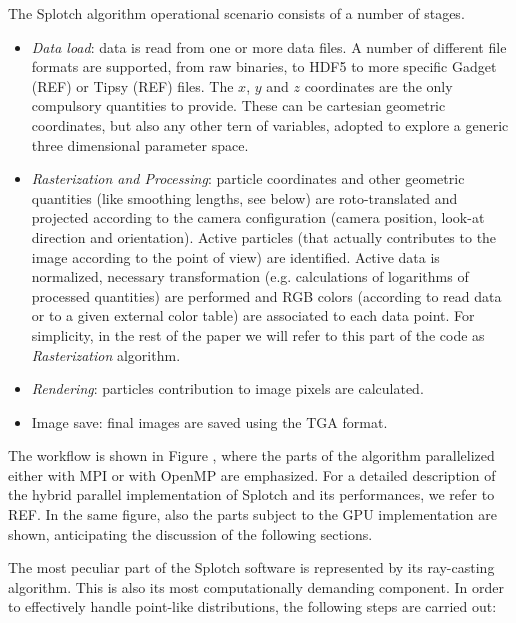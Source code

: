 \documentclass[11pt]{article}
\begin{document}
The Splotch algorithm operational scenario consists of a number of stages. 
\begin{itemize}
\item
{\it Data load}: data is read from one or more data files. A number of different file
formats are supported, from raw binaries, to HDF5 to more specific Gadget (REF) or Tipsy (REF)
files. The $x$, $y$ and $z$ coordinates are the only compulsory quantities to provide.
These can be cartesian geometric coordinates, but also any other tern 
of variables, adopted to explore a generic three dimensional parameter space.
\item
{\it Rasterization and Processing}: particle coordinates and other geometric quantities 
(like smoothing lengths, see below) are roto-translated and projected according to the 
camera configuration (camera position, look-at direction and orientation). 
Active particles (that actually contributes to the image according to the point of view)
are identified. Active data is normalized, necessary 
transformation (e.g. calculations of logarithms of processed quantities) are performed
and RGB colors (according to read data or to a given
external color table) are associated to each data point. For simplicity, in the rest 
of the paper we will refer to this part of the code as {\it Rasterization} algorithm.
\item
{\it Rendering}: particles contribution to image pixels are calculated.
\item
Image save: final images are saved using the TGA format.
\end{itemize}
The workflow is shown in Figure , where the parts of the algorithm parallelized
either with MPI or with OpenMP are emphasized. For a detailed description of
the hybrid parallel implementation of Splotch and its performances, we refer to REF.
In the same figure, also the parts subject to the GPU implementation are shown, 
anticipating the discussion of the following sections.


The most peculiar part of the Splotch software is represented by its ray-casting algorithm.
This is also its most computationally demanding component.
In order to effectively handle point-like distributions, the following 
steps are carried out: 
\end{document}
